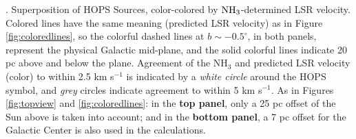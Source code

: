\textbf{\label{fig:HOPSoverlay}}.  Superposition of HOPS Sources, color-colored by ${\rm NH}_3$-determined LSR velocity.  Colored lines have the same meaning (predicted LSR velocity) as in Figure \ref{fig:coloredlines}, so the colorful dashed lines at $b\sim-0.5^\circ$, in both panels, represent the physical Galactic mid-plane, and the solid colorful lines indicate 20 pc above and below the plane. Agreement of the NH$_3$ and predicted LSR velocity (color) to within 2.5 km s$^{−1}$ is indicated by a \textit{white circle} around the HOPS symbol, and \textit{grey} circles indicate agreement to within 5 km s$^{−1}$. As in Figures \ref{fig:topview} and \ref{fig:coloredlines}: in the \textbf{top panel}, only a 25 pc offset of the Sun above is taken into account; and in the \textbf{bottom panel}, a 7 pc offset for the Galactic Center is also used in the calculations.